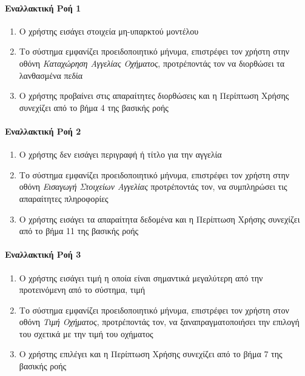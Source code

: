 \documentclass{../ol-softwaremanual}
\begin{document}
\paragraph{Εναλλακτική Ροή 1}

\begin{enumerate}
	\item O χρήστης εισάγει στοιχεία μη-υπαρκτού μοντέλου
	\item Το σύστημα εμφανίζει προειδοποιητικό μήνυμα, επιστρέφει τον χρήστη στην οθόνη \textit{Καταχώρηση Αγγελίας Οχήματος}, προτρέποντάς τον να διορθώσει τα λανθασμένα πεδία
	\item Ο χρήστης προβαίνει στις απαραίτητες διορθώσεις και η Περίπτωση Χρήσης συνεχίζει από το βήμα 4 της βασικής ροής
\end{enumerate}

\paragraph{Εναλλακτική Ροή 2}

\begin{enumerate}
	\item Ο χρήστης δεν εισάγει περιγραφή ή τίτλο για την αγγελία
	\item Το σύστημα εμφανίζει προειδοποιητικό μήνυμα, επιστρέφει τον χρήστη στην οθόνη \textit{Εισαγωγή Στοιχείων Αγγελίας} προτρέποντάς τον, να συμπληρώσει τις απαραίτητες πληροφορίες
	\item Ο χρήστης εισάγει τα απαραίτητα δεδομένα και η Περίπτωση Χρήσης συνεχίζει από το βήμα 11 της βασικής ροής
\end{enumerate}


\paragraph{Εναλλακτική Ροή 3}

\begin{enumerate}
	\item Ο χρήστης εισάγει τιμή η οποία είναι σημαντικά μεγαλύτερη από την προτεινόμενη από το σύστημα, τιμή
	\item Το σύστημα εμφανίζει προειδοποιητικό μήνυμα, επιστρέφει τον χρήστη στον οθόνη \textit{Τιμή Οχήματος}, προτρέποντάς τον, να ξαναπραγματοποιήσει την επιλογή του σχετικά με την τιμή του οχήματος
	\item Ο χρήστης επιλέγει και η Περίπτωση Χρήσης συνεχίζει από το βήμα 7 της βασικής ροής
\end{enumerate}
	
\end{document}
